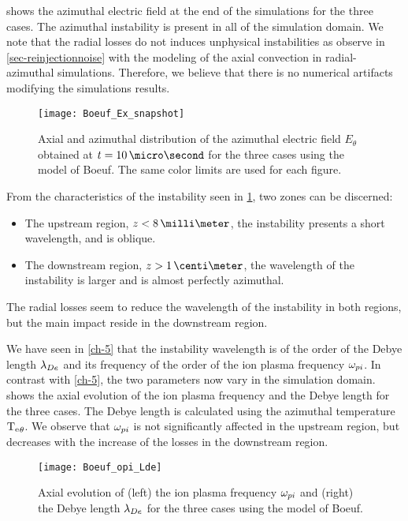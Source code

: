  shows the azimuthal electric field at the end of the simulations for the three cases.
The azimuthal instability is present in all of the simulation domain.
We note that the radial losses do not induces unphysical instabilities as observe in \cref{sec-reinjectionnoise} with the modeling of the axial convection in radial-azimuthal simulations.
Therefore, we believe that there is no numerical artifacts modifying the simulations results.

\begin{figure}[hbt]
  \centering
  \texttt{[image: Boeuf\_Ex\_snapshot]}
  \caption{Axial and azimuthal distribution of the azimuthal electric field $E_{\theta}$  obtained at $t=10 \,\micro\second$ for the three cases using the model of Boeuf. The same color limits are used for each figure.}
  \label{fig-snapshots}
\end{figure}

From the characteristics of the instability seen in \cref{fig-snapshots}, two zones can be discerned\string:
\begin{itemize}
  \item The upstream region, $z < 8 \,\milli\meter$, the instability presents a short wavelength, and is oblique.
  \item The downstream region, $z > 1\,\centi\meter$, the wavelength of the instability is larger and is almost perfectly azimuthal.
\end{itemize}
The radial losses seem to reduce the wavelength of the instability in both regions, but the main impact reside in the downstream region.


We have seen in \cref{ch-5} that the instability wavelength is of the order of the Debye length $\lambda_{De}$ and its frequency of the order of the ion plasma frequency $\omega_{pi}$.
In contrast with \cref{ch-5}, the two parameters now vary in the simulation domain.
 shows the axial evolution of the ion plasma frequency and the Debye length for the three cases.
The Debye length is calculated using the azimuthal temperature $\mathrm{T_e}_{\theta}$.
We observe that $\omega_{pi}$ is not significantly affected in the upstream region, but decreases with the increase of the losses in the downstream region.

\begin{figure}[hbt]
  \centering
  \texttt{[image: Boeuf\_opi\_Lde]}
  \caption{Axial evolution of (left) the ion plasma frequency $\omega_{pi}$ and (right) the Debye length $\lambda_{De}$ for the three cases using the model of Boeuf.}
  \label{fig-wpi_Lde}
\end{figure}


